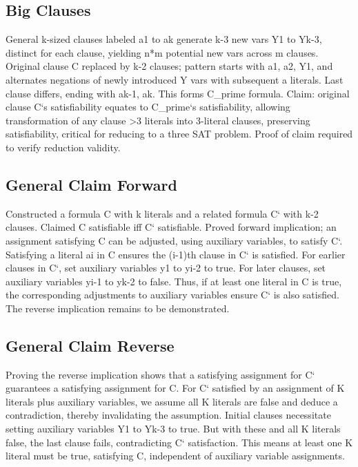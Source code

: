 \subsection*{Big Clauses}
General k-sized clauses labeled a1 to ak generate k-3 new vars Y1 to Yk-3, distinct for each clause, yielding n*m potential new vars across m clauses.
Original clause C replaced by k-2 clauses; pattern starts with a1, a2, Y1, and alternates negations of newly introduced Y vars with subsequent a literals.
Last clause differs, ending with ak-1, ak.
This forms C\_prime formula.
Claim: original clause C`s satisfiability equates to C\_prime`s satisfiability, allowing transformation of any clause \textgreater{}3 literals into 3-literal clauses, preserving satisfiability, critical for reducing to a three SAT problem.
Proof of claim required to verify reduction validity.

\subsection*{General Claim  Forward}
Constructed a formula C with k literals and a related formula C` with k-2 clauses.
Claimed C satisfiable iff C` satisfiable.
Proved forward implication; an assignment satisfying C can be adjusted, using auxiliary variables, to satisfy C`.
Satisfying a literal ai in C ensures the (i-1)th clause in C` is satisfied.
For earlier clauses in C`, set auxiliary variables y1 to yi-2 to true.
For later clauses, set auxiliary variables yi-1 to yk-2 to false.
Thus, if at least one literal in C is true, the corresponding adjustments to auxiliary variables ensure C` is also satisfied.
The reverse implication remains to be demonstrated.

\subsection*{General Claim  Reverse}
Proving the reverse implication shows that a satisfying assignment for C` guarantees a satisfying assignment for C\@.
For C` satisfied by an assignment of K literals plus auxiliary variables, we assume all K literals are false and deduce a contradiction, thereby invalidating the assumption.
Initial clauses necessitate setting auxiliary variables Y1 to Yk-3 to true.
But with these and all K literals false, the last clause fails, contradicting C` satisfaction.
This means at least one K literal must be true, satisfying C, independent of auxiliary variable assignments.


